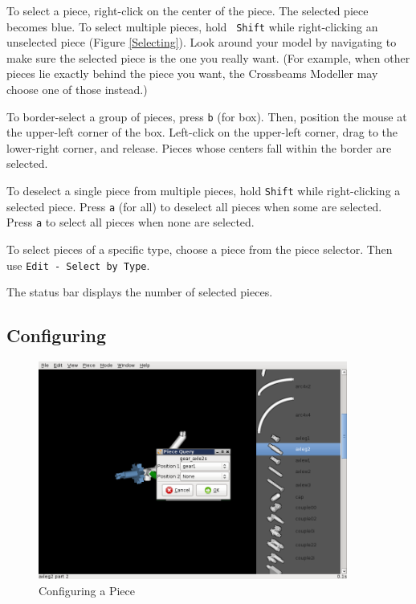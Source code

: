 \documentclass[12pt]{report}
\begin{document}
To select a piece, right-click on the center of the piece.  The
selected piece becomes blue.  To select multiple pieces, hold {\tt
  Shift} while right-clicking an unselected piece (Figure
\ref{Selecting}).  Look around your model by navigating to make sure
the selected piece is the one you really want.  (For example, when
other pieces lie exactly behind the piece you want, the Crossbeams
Modeller may choose one of those instead.)

To border-select a group of pieces, press {\tt b} (for box).  Then,
position the mouse at the upper-left corner of the box.  Left-click on
the upper-left corner, drag to the lower-right corner, and release.
Pieces whose centers fall within the border are selected.

To deselect a single piece from multiple pieces, hold {\tt Shift}
while right-clicking a selected piece.  Press {\tt a} (for all) to
deselect all pieces when some are selected.  Press {\tt a} to select
all pieces when none are selected.

To select pieces of a specific type, choose a piece from the piece
selector.  Then use {\tt Edit - Select by Type}.

The status bar displays the number of selected pieces.

\subsection{Configuring}

\begin{figure}[h]
\begin{center}
\includegraphics[width=4.0in]{doc_images/manual_configuring.png}
\caption{Configuring a Piece}
\label{Configuring}
\end{center}
\end{figure}
\end{document}
